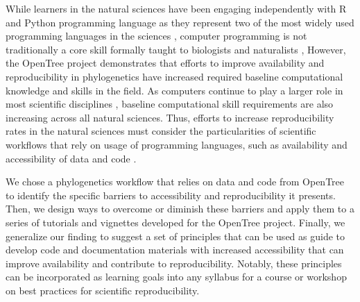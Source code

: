 \documentclass[12pt]{article}
\begin{document}
While learners in the natural sciences have been engaging independently with R
and Python programming language
as they represent two of the most widely used programming languages in the sciences
\citep{baker2017scientific}, computer programming is not traditionally
a core skill formally taught to biologists and naturalists
\citep{sayres2018bioinformatics, wright2019the, williams2019barriers},
However, the OpenTree project demonstrates that efforts to improve availability and reproducibility
in phylogenetics have increased required baseline computational knowledge and skills
in the field.
As computers continue to play a larger role in most scientific disciplines \citep{piccolo2016tools},
baseline computational skill requirements are also increasing across all natural sciences.
Thus, efforts to increase reproducibility rates in the natural sciences must consider
the particularities of scientific workflows that rely on usage of programming languages, such as
availability and accessibility of data and code \citep{peng2011reproducible, sandve2013ten, powers2019open}.

We chose a phylogenetics workflow that relies on data and code from OpenTree to
identify the specific barriers to accessibility and reproducibility it presents.
Then, we design ways to overcome or diminish these barriers and apply them to
a series of tutorials and vignettes developed for the OpenTree project.
Finally, we generalize our finding to suggest a set of
principles that can be used as guide to develop code and documentation materials
with increased accessibility that can improve availability and contribute to reproducibility.
Notably, these principles can be incorporated as learning goals into any syllabus for a
course or workshop on best practices for scientific reproducibility.
\end{document}
